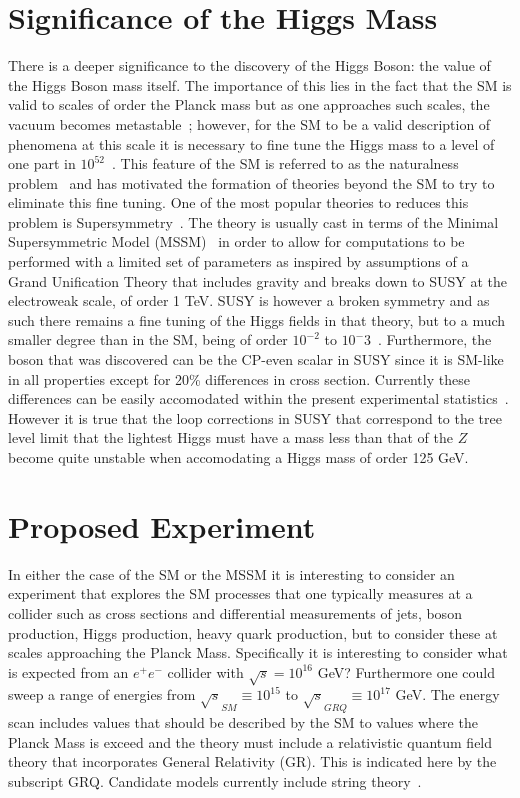 \documentclass[a4paper]{article}
\begin{document}
\section{Significance of the Higgs Mass}
\label{sec:finetune}
There is a deeper significance to the discovery of the Higgs Boson: the value of the Higgs Boson mass itself.
The importance of this lies in the fact that the
SM is valid to scales of order the Planck mass but as one approaches
such scales, the vacuum becomes metastable~\cite{ref:instabilityPlanck}; however, for the SM to 
be a valid description of phenomena at this scale it is necessary to fine
tune the Higgs mass to a level of one part in $10^{52}$~\cite{ref:finetuning}.  
This feature of the SM is referred to as the naturalness problem~\cite{ref:unnat} and has motivated
the formation of theories beyond the SM to try to eliminate this fine tuning.   One of
the most popular theories to reduces this problem is Supersymmetry~\cite{ref:susy}. The theory is 
 usually cast in terms of the Minimal 
Supersymmetric Model (MSSM)~\cite{ref:MSSM} in order to allow for 
computations to be performed with a limited set of parameters as inspired
by assumptions of a Grand Unification Theory that includes gravity and
breaks down to SUSY at the electroweak scale, of order 1 TeV.  SUSY
is however a broken symmetry and as such there remains a fine tuning of
the Higgs fields in that theory, but to a much smaller degree than in the SM, being
of order $10^{-2}$ to ${10^-3}$~\cite{ref:SUSY-unnat}. Furthermore, the boson
that was discovered can be the CP-even scalar in SUSY since it is 
SM-like in all properties except for 20\% differences in cross section. Currently these
differences  can be 
easily accomodated within the present experimental
statistics~\cite{ref:crossSecSusyroom}.  However it is true that the 
loop corrections in SUSY that correspond to the tree level limit that the
lightest Higgs must have a mass less than that of the $Z$ become quite
unstable when accomodating a Higgs mass of order 125 GeV.

\section{Proposed Experiment}
\label{sec:collider}
  In either the case of the SM or the MSSM it is interesting to consider
an experiment that explores the SM processes that one typically measures
at a collider such as cross sections and differential measurements of
jets, boson production, Higgs production, heavy
quark production, but to consider these at scales approaching the Planck Mass. 
Specifically it is interesting to consider what is expected from an $e^+ e^-$ collider with
$\sqrt{s}= 10^{16}$ GeV?   Furthermore one could sweep a range of energies from
$\sqrt{s}_{SM} \equiv 10^{15}$ to $\sqrt{s}_{GRQ}\equiv 10^{17}$ GeV. 
The energy scan includes values that should be described by the SM to values
where the Planck Mass is exceed and the theory must include a relativistic
quantum field theory that incorporates General Relativity (GR). This is indicated here
by the subscript GRQ. Candidate models currently include string theory~\cite{ref:string}.
\end{document}
